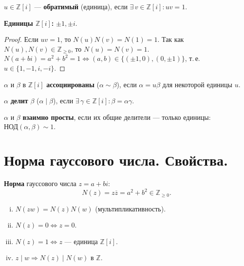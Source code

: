 \documentclass[12pt]{article}
\begin{document}
\begin{definition}
$u \in \mathbb{Z}[i]$ --- \textbf{обратимый} (единица), если
$\exists\, v \in \mathbb{Z}[i]\colon uv = 1$.

\textbf{Единицы $\mathbb{Z}[i]$:} $\pm 1, \pm i$.
\end{definition}

\begin{proof}
Если $uv = 1$, то $N(u)N(v) = N(1) = 1$.
Так как $N(u), N(v) \in \mathbb{Z}_{\geq 0}$, то $N(u) = N(v) = 1$.
$N(a+bi) = a^2+b^2 = 1 \iff (a,b) \in \{(\pm 1, 0),(0,\pm 1)\}$,
т.\,е.\ $u \in \{1,-1,i,-i\}$.
\end{proof}

\begin{definition}
$\alpha$ и $\beta$ в $\mathbb{Z}[i]$ \textbf{ассоциированы} ($\alpha \sim \beta$),
если $\alpha = u\beta$ для некоторой единицы $u$.
\end{definition}

\begin{definition}
$\alpha$ \textbf{делит} $\beta$ ($\alpha \mid \beta$), если
$\exists\, \gamma \in \mathbb{Z}[i]\colon \beta = \alpha\gamma$.
\end{definition}

\begin{definition}
$\alpha$ и $\beta$ \textbf{взаимно просты}, если их общие делители ---
только единицы: $\text{НОД}(\alpha,\beta) \sim 1$.
\end{definition}

\section{Норма гауссового числа. Свойства.}

\begin{definition}
\textbf{Норма} гауссового числа $z = a+bi$:
\[
N(z) = z\overline{z} = a^2 + b^2 \in \mathbb{Z}_{\geq 0}.
\]
\end{definition}

\begin{property}
\begin{enumerate}[(i)]
\item $N(zw) = N(z)N(w)$ (мультипликативность).
\item $N(z) = 0 \iff z = 0$.
\item $N(z) = 1 \iff z$ --- единица $\mathbb{Z}[i]$.
\item $z \mid w \Rightarrow N(z) \mid N(w)$ в $\mathbb{Z}$.
\end{enumerate}
\end{property}
\end{document}
